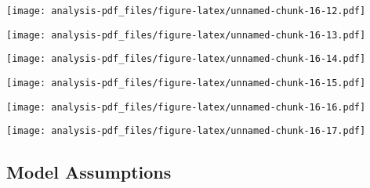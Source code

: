 \documentclass[
]{article}
\newenvironment{Shaded}{\begin{snugshade}}{\end{snugshade}}
\newcommand{\KeywordTok}[1]{\textcolor[rgb]{0.13,0.29,0.53}{\textbf{#1}}}
\newcommand{\NormalTok}[1]{#1}
\newcommand{\OperatorTok}[1]{\textcolor[rgb]{0.81,0.36,0.00}{\textbf{#1}}}
\begin{document}
\texttt{[image: analysis-pdf\_files/figure-latex/unnamed-chunk-16-12.pdf]}

\begin{Shaded}
\end{Shaded}

\texttt{[image: analysis-pdf\_files/figure-latex/unnamed-chunk-16-13.pdf]}

\begin{Shaded}
\end{Shaded}

\texttt{[image: analysis-pdf\_files/figure-latex/unnamed-chunk-16-14.pdf]}

\begin{Shaded}
\end{Shaded}

\texttt{[image: analysis-pdf\_files/figure-latex/unnamed-chunk-16-15.pdf]}

\begin{Shaded}
\end{Shaded}

\texttt{[image: analysis-pdf\_files/figure-latex/unnamed-chunk-16-16.pdf]}

\begin{Shaded}
\end{Shaded}

\texttt{[image: analysis-pdf\_files/figure-latex/unnamed-chunk-16-17.pdf]}

\hypertarget{model-assumptions}{%
\subsection{Model Assumptions}\label{model-assumptions}}
\end{document}
